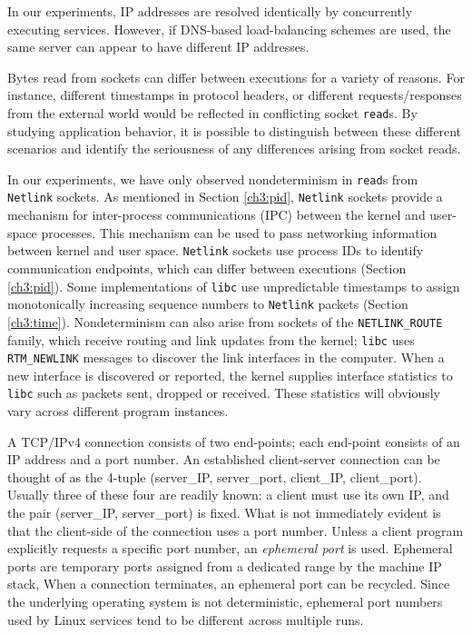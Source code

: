  \newline
In our experiments, IP addresses are resolved identically by concurrently executing services. 
However, if DNS-based load-balancing schemes are used, the same 
server can appear to have different IP addresses. \newline

 \newline
Bytes read from sockets can differ between
executions for a variety
of reasons. For instance, different timestamps in 
protocol headers, or different requests/responses 
from the external world would be reflected in
conflicting socket \texttt{read}s.
By studying application behavior, it is possible
to distinguish between 
these different scenarios and
identify the seriousness
of any differences arising from socket reads.

In our experiments, we have only observed nondeterminism
in \texttt{read}s from \texttt{Netlink} sockets.
As mentioned in Section \ref{ch3:pid},
\texttt{Netlink} sockets provide a 
mechanism for inter-process communications (IPC)
between the kernel and user-space processes.
This mechanism can be used to pass
networking information between kernel
and user space. \texttt{Netlink} sockets
use process IDs to identify
communication endpoints, which can
differ between executions (Section \ref{ch3:pid}).
Some implementations of \texttt{libc} use
unpredictable timestamps to assign monotonically increasing sequence 
numbers to \texttt{Netlink} packets (Section \ref{ch3:time}).
Nondeterminism can also arise from sockets of the \texttt{NETLINK\_ROUTE}
family, which receive routing and link updates
from the kernel; \texttt{libc} uses \texttt{RTM\_NEWLINK}
messages to discover the link interfaces 
in the computer. When a new interface
is discovered or reported, the kernel supplies
interface statistics to \texttt{libc} 
such as packets sent, dropped or
received. These statistics will obviously vary
across different program instances.  \newline

 \newline
A TCP/IPv4 connection consists of two end-points;
each end-point consists of an IP address and a port
number. An established client-server connection 
can be thought of as the
4-tuple (server\_IP, server\_port, client\_IP, client\_port).
Usually three of these four are readily known:
a client must use its own IP, and
the pair (server\_IP, server\_port) is fixed. What is not
immediately evident is that the client-side of 
the connection uses a port number.
Unless a client program explicitly
requests a specific port number,
an {\em ephemeral port} is used.
Ephemeral ports are temporary ports
assigned from a dedicated range by the machine IP stack,
When a connection
terminates, an ephemeral port can be recycled.
Since the underlying operating system
is not deterministic, ephemeral
port numbers used by Linux services
tend to be different across multiple 
runs. 

